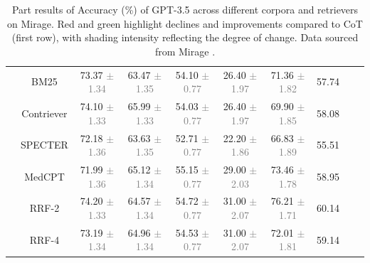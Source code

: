 \begin{table}
{\begin{tabular}{cccccccccc}
		& BM25 &  73.37 \textcolor{gray}{\scriptsize $\pm$ 1.34} &  63.47 \textcolor{gray}{\scriptsize $\pm$ 1.35} &  54.10 \textcolor{gray}{\scriptsize $\pm$ 0.77} &  26.40 \textcolor{gray}{\scriptsize $\pm$ 1.97} &  71.36 \textcolor{gray}{\scriptsize $\pm$ 1.82} &  57.74 \\
		& Contriever &  74.10 \textcolor{gray}{\scriptsize $\pm$ 1.33} &  65.99 \textcolor{gray}{\scriptsize $\pm$ 1.33} &  54.03 \textcolor{gray}{\scriptsize $\pm$ 0.77} &  26.40 \textcolor{gray}{\scriptsize $\pm$ 1.97} &  69.90 \textcolor{gray}{\scriptsize $\pm$ 1.85} &  58.08 \\
		& SPECTER &  72.18 \textcolor{gray}{\scriptsize $\pm$ 1.36} &  63.63 \textcolor{gray}{\scriptsize $\pm$ 1.35} &  52.71 \textcolor{gray}{\scriptsize $\pm$ 0.77} &  22.20 \textcolor{gray}{\scriptsize $\pm$ 1.86} &  66.83 \textcolor{gray}{\scriptsize $\pm$ 1.89} &  55.51 \\
		& MedCPT &  71.99 \textcolor{gray}{\scriptsize $\pm$ 1.36} &  65.12 \textcolor{gray}{\scriptsize $\pm$ 1.34} &  55.15 \textcolor{gray}{\scriptsize $\pm$ 0.77} &  29.00 \textcolor{gray}{\scriptsize $\pm$ 2.03} &  73.46 \textcolor{gray}{\scriptsize $\pm$ 1.78} &  58.95 \\
		& RRF-2 &  74.20 \textcolor{gray}{\scriptsize $\pm$ 1.33} &  64.57 \textcolor{gray}{\scriptsize $\pm$ 1.34} &  54.72 \textcolor{gray}{\scriptsize $\pm$ 0.77} &  31.00 \textcolor{gray}{\scriptsize $\pm$ 2.07} &  76.21 \textcolor{gray}{\scriptsize $\pm$ 1.71} &  60.14 \\
		& RRF-4 &  73.19 \textcolor{gray}{\scriptsize $\pm$ 1.34} &  64.96 \textcolor{gray}{\scriptsize $\pm$ 1.34} &  54.53 \textcolor{gray}{\scriptsize $\pm$ 0.77} &  31.00 \textcolor{gray}{\scriptsize $\pm$ 2.07} &  72.01 \textcolor{gray}{\scriptsize $\pm$ 1.81} &  59.14 \\
		
		\bottomrule
	\end{tabular}
	}
	\caption{Part results of Accuracy (\%) of GPT-3.5 across different corpora and retrievers on Mirage. Red and green highlight \colorbox{red!50}{declines} and \colorbox{green!50}{improvements} compared to CoT (first row), with shading intensity reflecting the degree of change. Data sourced from Mirage \cite{xiong2024benchmarking}.}
	\label{tab:retrievalcomp}
\end{table}

